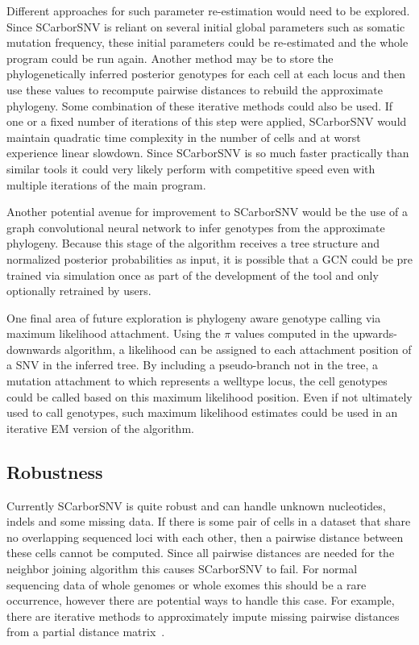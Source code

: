\documentclass[../main.tex]{subfiles}
\begin{document}
Different approaches for such parameter re-estimation would need to be explored.
Since SCarborSNV is reliant on several initial global parameters such as somatic mutation frequency, these initial parameters could be re-estimated and the whole program could be run again.
Another method may be to store the phylogenetically inferred posterior genotypes for each cell at each locus and then use these values to recompute pairwise distances to rebuild the approximate phylogeny.
Some combination of these iterative methods could also be used.
If one or a fixed number of iterations of this step were applied, SCarborSNV would maintain quadratic time complexity in the number of cells and at worst experience linear slowdown.
Since SCarborSNV is so much faster practically than similar tools it could very likely perform with competitive speed even with multiple iterations of the main program.

Another potential avenue for improvement to SCarborSNV would be the use of a graph convolutional neural network to infer genotypes from the approximate phylogeny.
Because this stage of the algorithm receives a tree structure and normalized posterior probabilities as input, it is possible that a GCN could be pre trained via simulation once as part of the development of the tool and only optionally retrained by users.

One final area of future exploration is phylogeny aware genotype calling via maximum likelihood attachment.
Using the $\pi$ values computed in the upwards-downwards algorithm, a likelihood can be assigned to each attachment position of a SNV in the inferred tree.
By including a pseudo-branch not in the tree, a mutation attachment to which represents a welltype locus, the cell genotypes could be called based on this maximum likelihood position.
Even if not ultimately used to call genotypes, such maximum likelihood estimates could be used in an iterative EM version of the algorithm.

\subsection{Robustness}
Currently SCarborSNV is quite robust and can handle unknown nucleotides, indels and some missing data.
If there is some pair of cells in a dataset that share no overlapping sequenced loci with each other, then a pairwise distance between these cells cannot be computed.
Since all pairwise distances are needed for the neighbor joining algorithm this causes SCarborSNV to fail.
For normal sequencing data of whole genomes or whole exomes this should be a rare occurrence, however there are potential ways to handle this case.
For example, there are iterative methods to approximately impute missing pairwise distances from a partial distance matrix~\cite{missingNJ}.
\end{document}
